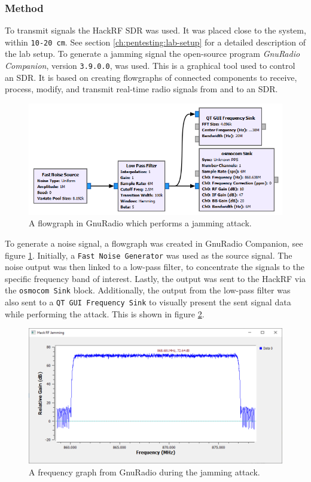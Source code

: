 \subsubsection{Method}
To transmit signals the HackRF SDR was used. It was placed close to the system, within \texttt{10-20 cm}. See section \ref{ch:pentesting:lab-setup} for a detailed description of the lab setup. To generate a jamming signal the open-source program \textit{GnuRadio Companion}, version \texttt{3.9.0.0}, was used. This is a graphical tool used to control an SDR. It is based on creating flowgraphs of connected components to receive, process, modify, and transmit real-time radio signals from and to an SDR.
\begin{figure}[!ht]
    \centering
    \includegraphics[width=\textwidth]{images/6-pentesting/jamming-flowgraph.png}
    \caption{A flowgraph in GnuRadio which performs a jamming attack.}
    \label{fig:gnuradio-jamming-flowgraph}
\end{figure}
To generate a noise signal, a flowgraph was created in GnuRadio Companion, see figure \ref{fig:gnuradio-jamming-flowgraph}. Initially, a \texttt{Fast Noise Generator} was used as the source signal. The noise output was then linked to a low-pass filter, to concentrate the signals to the specific frequency band of interest. Lastly, the output was sent to the HackRF via the \texttt{osmocom Sink} block. Additionally, the output from the low-pass filter was also sent to a \texttt{QT GUI Frequency Sink} to visually present the sent signal data while performing the attack. This is shown in figure \ref{fig:gnuradio-frequency-graph}.
\begin{figure}[!ht]
    \centering
    \includegraphics[width=\textwidth]{images/6-pentesting/jamming-output-graph.png}
    \caption{A frequency graph from GnuRadio during the jamming attack.}
    \label{fig:gnuradio-frequency-graph}
\end{figure}

